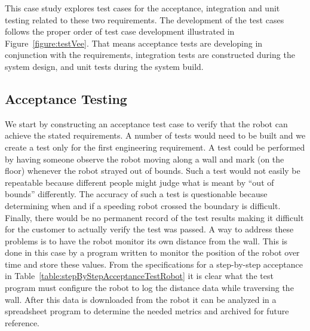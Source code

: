 This case study explores test cases for the acceptance, integration and
unit testing related to these two requirements. The development of the
test cases follows the proper order of test case development illustrated
in Figure~\ref{figure:testVee}. 
That means acceptance tests are developing in conjunction
with the requirements, integration tests are constructed during the
system design, and unit tests during the system build.

\subsection*{Acceptance Testing}
\label{subsection:acceptance-testing-1}


We start by constructing an acceptance test case to verify that the
robot can achieve the stated requirements. A number of tests would need
to be built and we create a test only for the first engineering
requirement. A test could be performed by having someone observe the
robot moving along a wall and mark (on the floor) whenever the robot
strayed out of bounds. Such a test would not easily be repeatable
because different people might judge what is meant by ``out of bounds''
differently. The accuracy of such a test is questionable because
determining when and if a speeding robot crossed the boundary is
difficult. Finally, there would be no permanent record of the test
results making it difficult for the customer to actually verify the test
was passed. A way to address these problems is to have the robot monitor
its own distance from the wall. This is done in this case by a program
written to monitor the position of the robot over time and store these
values. From the specifications for a step-by-step acceptance in 
Table~\ref{table:stepByStepAcceptanceTestRobot}
it is clear what the test program must configure the robot to log
the distance data while traversing the wall. After this data is
downloaded from the robot it can be analyzed in a spreadsheet program to
determine the needed metrics and archived for future reference.

